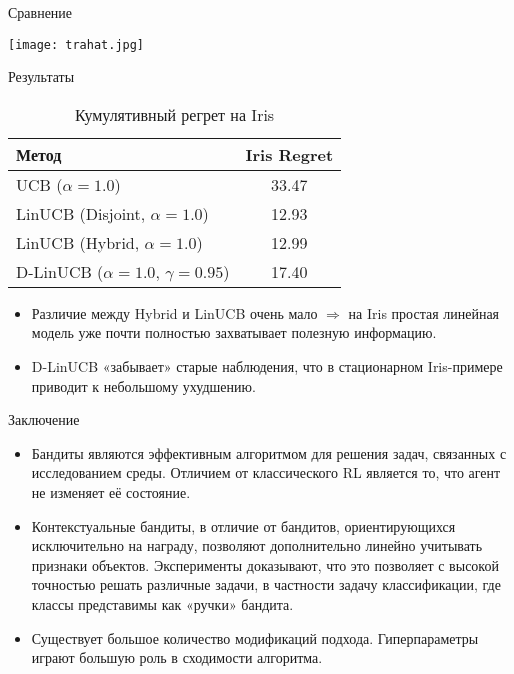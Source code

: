 \documentclass[10pt]{beamer}
\begin{document}
\begin{frame}{Сравнение}
  \begin{center}
    \texttt{[image: trahat.jpg]}
  \end{center}
\end{frame}
\begin{frame}{Результаты}
 \begin{table}[ht]
    \centering
    \begin{tabular}{l c}
      \hline
      \textbf{Метод} & \textbf{Iris Regret} \\
      \hline
      UCB (\(\alpha=1.0\)) & 33.47 \\
      LinUCB (Disjoint, \(\alpha=1.0\)) & 12.93 \\
      LinUCB (Hybrid, \(\alpha=1.0\)) & 12.99 \\
      D-LinUCB (\(\alpha=1.0,\,\gamma=0.95\)) & 17.40 \\
      \hline
    \end{tabular}
    \caption{Кумулятивный регрет на Iris}
  \end{table}
  \vspace{1em}
  \begin{itemize}
    \item Различие между Hybrid и LinUCB очень мало $\Longrightarrow$ на Iris простая линейная модель уже почти полностью захватывает полезную информацию.
    \item D-LinUCB «забывает» старые наблюдения, что в стационарном Iris-примере приводит к небольшому ухудшению.
  \end{itemize}
\end{frame}
\begin{frame}{Заключение}
  \begin{itemize}
    \item Бандиты являются эффективным алгоритмом для решения задач, связанных с исследованием среды. Отличием от классического RL является то, что агент не изменяет её состояние.
    \item Контекстуальные бандиты, в отличие от бандитов, ориентирующихся исключительно на награду, позволяют дополнительно линейно учитывать признаки объектов.
Эксперименты доказывают, что это позволяет с высокой точностью решать различные задачи, в частности задачу классификации, где классы представимы как «ручки» бандита.
    \item Существует большое количество модификаций подхода. Гиперпараметры играют большую роль в сходимости алгоритма.
  \end{itemize}
\end{frame}
\end{document}
